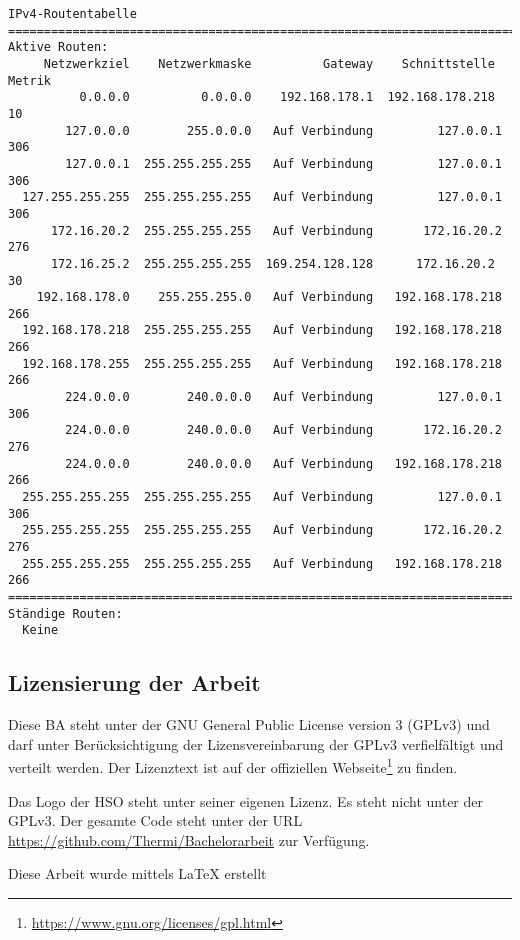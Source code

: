\begin{lstlisting}[caption=Ausgabe von ipconfig und route -4 print,label=lst:ipconfigroute4]
IPv4-Routentabelle
===========================================================================
Aktive Routen:
     Netzwerkziel    Netzwerkmaske          Gateway    Schnittstelle Metrik
          0.0.0.0          0.0.0.0    192.168.178.1  192.168.178.218     10
        127.0.0.0        255.0.0.0   Auf Verbindung         127.0.0.1    306
        127.0.0.1  255.255.255.255   Auf Verbindung         127.0.0.1    306
  127.255.255.255  255.255.255.255   Auf Verbindung         127.0.0.1    306
      172.16.20.2  255.255.255.255   Auf Verbindung       172.16.20.2    276
      172.16.25.2  255.255.255.255  169.254.128.128      172.16.20.2     30
    192.168.178.0    255.255.255.0   Auf Verbindung   192.168.178.218    266
  192.168.178.218  255.255.255.255   Auf Verbindung   192.168.178.218    266
  192.168.178.255  255.255.255.255   Auf Verbindung   192.168.178.218    266
        224.0.0.0        240.0.0.0   Auf Verbindung         127.0.0.1    306
        224.0.0.0        240.0.0.0   Auf Verbindung       172.16.20.2    276
        224.0.0.0        240.0.0.0   Auf Verbindung   192.168.178.218    266
  255.255.255.255  255.255.255.255   Auf Verbindung         127.0.0.1    306
  255.255.255.255  255.255.255.255   Auf Verbindung       172.16.20.2    276
  255.255.255.255  255.255.255.255   Auf Verbindung   192.168.178.218    266
===========================================================================
Ständige Routen:
  Keine

\end{lstlisting}
\subsection{Lizensierung der Arbeit}
Diese \ac{BA} steht unter der GNU General Public License version 3 (GPLv3)
und darf unter Berücksichtigung der Lizensvereinbarung der GPLv3 verfielfältigt
und verteilt werden. Der Lizenztext ist auf der offiziellen Webseite\footnote{\url{https://www.gnu.org/licenses/gpl.html}}
zu finden.

Das Logo der \ac{HSO} steht unter seiner eigenen Lizenz. Es steht nicht unter der GPLv3.
Der gesamte Code steht unter der URL \url{https://github.com/Thermi/Bachelorarbeit} zur Verfügung.

\begin{centering} 

Diese Arbeit wurde mittels \LaTeX{} erstellt
\end{centering}
